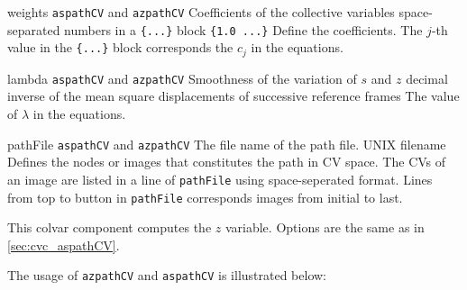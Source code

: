 \begin{cvcoptions}
\item %
  \keydef
    {weights}{%
    \texttt{aspathCV} and \texttt{azpathCV}}{%
    Coefficients of the collective variables}{%
    space-separated numbers in a \texttt{\{...\}} block}{%
    \texttt{\{1.0 ...\}}}{%
    Define the coefficients. The $j$-th value in the \texttt{\{...\}} block corresponds the $c_{j}$ in the equations.
  }

\item %
  \keydef
    {lambda}{%
    \texttt{aspathCV} and \texttt{azpathCV}}{%
    Smoothness of the variation of $s$ and $z$}{%
    decimal}{%
    inverse of the mean square displacements of successive reference frames}{%
    The value of $\lambda$ in the equations.
  }

\item %
  \key
    {pathFile}{%
    \texttt{aspathCV} and \texttt{azpathCV}}{%
    The file name of the path file.}{%
    UNIX filename}{%
		Defines the nodes or images that constitutes the path in CV space. The CVs of an image are listed in a line of \texttt{pathFile} using space-seperated format. Lines from top to button in \texttt{pathFile} corresponds images from initial to last.
    }

\end{cvcoptions}


This colvar component computes the $z$ variable. Options are the same as in \ref{sec:cvc_aspathCV}.

The usage of \texttt{azpathCV} and \texttt{aspathCV} is illustrated below:

